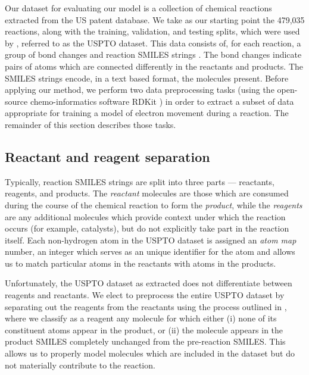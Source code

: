 

Our dataset for evaluating our model is a collection of chemical reactions extracted from the US patent database.
We take as our starting point the 479,035 reactions, along with the training, validation, and testing splits, 
which were used by \citet{jin2017predicting}, referred to as the USPTO dataset.
This data consists of, for each reaction, a group of bond changes and reaction SMILES strings \citep{weininger1988smiles}.
The bond changes indicate pairs of atoms which are connected differently in the reactants and products.
The SMILES strings encode, in a text based format, the molecules present.
Before applying our method, we perform two data preprocessing tasks (using the open-source chemo-informatics software RDKit
  \citep{rdkit}) in order to extract a subset of data appropriate for training a
 model of electron movement during a reaction. The remainder of this section describes those tasks.

\subsection{Reactant and reagent separation}

Typically, reaction SMILES strings are split into three parts --- reactants, reagents, and products.
The {\em reactant} molecules are those which are consumed during the course of the chemical reaction to form the {\em product}, 
while the {\em reagents} are any additional molecules which provide context under which the reaction occurs (for example, catalysts),
but do not explicitly take part in the reaction  itself.
Each non-hydrogen atom in the USPTO dataset is assigned an {\em atom map} number, an integer which serves as an unique identifier for the atom and allows us to match particular atoms in the reactants with atoms in the products.

Unfortunately, the USPTO dataset as extracted does not differentiate between reagents and reactants.
We elect to preprocess the entire USPTO dataset by separating out the reagents from the reactants using the process outlined in \citet{schwaller2017found}, where we classify as a reagent any molecule for which either 
(i) none of its constituent atoms appear in the product, or 
(ii) the molecule appears in the product SMILES completely unchanged from the pre-reaction SMILES.
This allows us to properly model molecules which are included in the dataset but do not materially contribute to the reaction.

